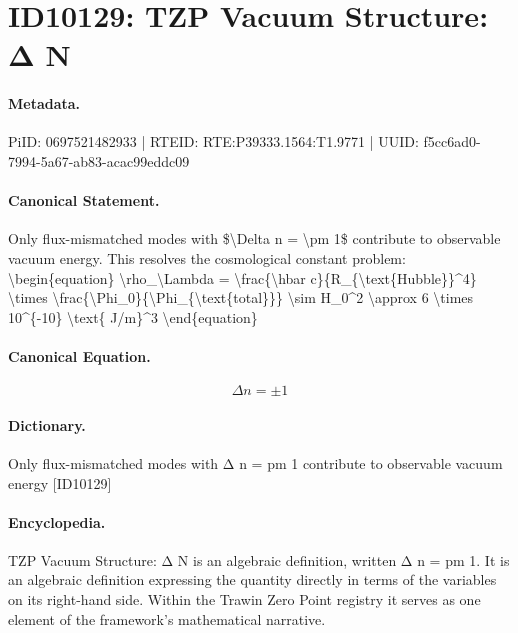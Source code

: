 \section*{ID10129: TZP Vacuum Structure: Δ N}
\paragraph{Metadata.}
PiID: 0697521482933 | RTEID: RTE:P39333.1564:T1.9771 | UUID: f5cc6ad0-7994-5a67-ab83-acac99eddc09

\paragraph{Canonical Statement.}
Only flux-mismatched modes with \$\textbackslash{}Delta n = \textbackslash{}pm 1\$ contribute to observable vacuum energy. This resolves the cosmological constant problem: \textbackslash{}begin\{equation\} \textbackslash{}rho\_\textbackslash{}Lambda = \textbackslash{}frac\{\textbackslash{}hbar c\}\{R\_\{\textbackslash{}text\{Hubble\}\}\textasciicircum{}4\} \textbackslash{}times \textbackslash{}frac\{\textbackslash{}Phi\_0\}\{\textbackslash{}Phi\_\{\textbackslash{}text\{total\}\}\} \textbackslash{}sim H\_0\textasciicircum{}2 \textbackslash{}approx 6 \textbackslash{}times 10\textasciicircum{}\{-10\} \textbackslash{}text\{ J/m\}\textasciicircum{}3 \textbackslash{}end\{equation\}

\paragraph{Canonical Equation.}
\[
\Delta n = \pm 1
\]

\paragraph{Dictionary.}
Only flux-mismatched modes with Δ n = pm 1 contribute to observable vacuum energy [ID10129]

\paragraph{Encyclopedia.}
TZP Vacuum Structure: Δ N is an algebraic definition, written Δ n = pm 1. It is an algebraic definition expressing the quantity directly in terms of the variables on its right-hand side. Within the Trawin Zero Point registry it serves as one element of the framework's mathematical narrative.
